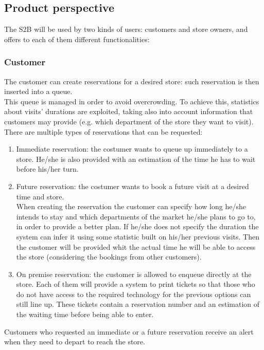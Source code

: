 \subsection{Product perspective}
The S2B will be used by two kinds of users: customers and store owners, and offers to each of them different functionalities:
\subsubsection{Customer}
The customer can create reservations for a desired store: such reservation is then inserted into a queue.\\This queue is managed in order to avoid overcrowding. To achieve this, statistics about visits' durations are exploited, taking also into account information that customers may provide (e.g. which department of the store they want to visit).\\
There are multiple types of reservations that can be requested:
\begin{enumerate}
	\item Immediate reservation: the costumer wants to queue up immediately to a store. He/she is also provided with an estimation of the time he has to wait before his/her turn.
	\item Future reservation: the costumer wants to book a future visit at a desired time and store.\\ When creating the reservation the customer can specify how long he/she intends to stay and which departments of the market he/she plans to go to, in order to provide a better plan. If he/she does not specify the duration the system can infer it using some statistic built on his/her previous visits. Then the customer will be provided whit the actual time he will be able to access the store (considering the bookings from other customers).
	\item On premise reservation: the customer is allowed to enqueue directly at the store. Each of them will provide a system to print tickets so that those who do not have access to the required technology for the previous options can still line up. These tickets contain a reservation number and an estimation of the waiting time before being able to enter.
\end{enumerate}
Customers who requested an immediate or a future reservation receive an alert when they need to depart to reach the store.
